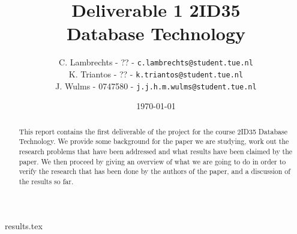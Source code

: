 \documentclass[a4paper,twoside,11pt]{article}
\title{\vspace{-\baselineskip}\sffamily\bfseries Deliverable 1 2ID35 \\ Database Technology }
\author{
C. Lambrechts - ?? - {\tt c.lambrechts@student.tue.nl} \\
K. Triantos - ?? - {\tt k.triantos@student.tue.nl}\\
J. Wulms - 0747580 - {\tt j.j.h.m.wulms@student.tue.nl}\\
}
\date{\today}
\numberwithin{equation}{section}
\begin{document}
\maketitle
\thispagestyle{empty}
\begin{abstract}
This report contains the first deliverable of the project for the course 2ID35 Database Technology. We provide some background for the paper we are studying, work out the research problems that have been addressed and what results have been claimed by the paper. We then proceed by giving an overview of what we are going to do in order to verify the research that has been done by the authors of the paper, and a discussion of the results so far.
\end{abstract}





 {results.tex}




\end{document}
